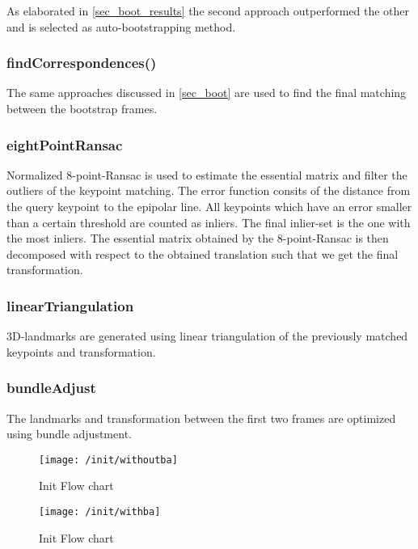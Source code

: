 As elaborated in \cref{sec_boot_results} the second approach outperformed the other and is selected as auto-bootstrapping method.


\subsubsection{findCorrespondences()}
The same approaches discussed in \cref{sec_boot} are used to find the final matching between the bootstrap frames.


\subsubsection{eightPointRansac}
Normalized 8-point-Ransac is used to estimate the essential matrix and filter the outliers of the keypoint matching.
The error function consits of the distance from the query keypoint to the epipolar line. All keypoints which have an error smaller than a certain threshold are counted as inliers. The final inlier-set is the one with the most inliers.
The essential matrix obtained by the 8-point-Ransac is then decomposed with respect to the obtained translation such that we get the final transformation.

\subsubsection{linearTriangulation}
3D-landmarks are generated using linear triangulation of the previously matched keypoints and transformation.

\subsubsection{bundleAdjust}
The landmarks and transformation between the first two frames are optimized using bundle adjustment.
\begin{figure}[ht]
\begin{minipage}{.5\textwidth}
	\centering
	\texttt{[image: /init/withoutba]}
	\caption{Init Flow chart}
	\label{img_flow_init}
\end{minipage}%
\begin{minipage}{.5\textwidth}
	\centering
	\texttt{[image: /init/withba]}
	\caption{Init Flow chart}
	\label{img_flow_init}
\end{minipage}%
\end{figure}


